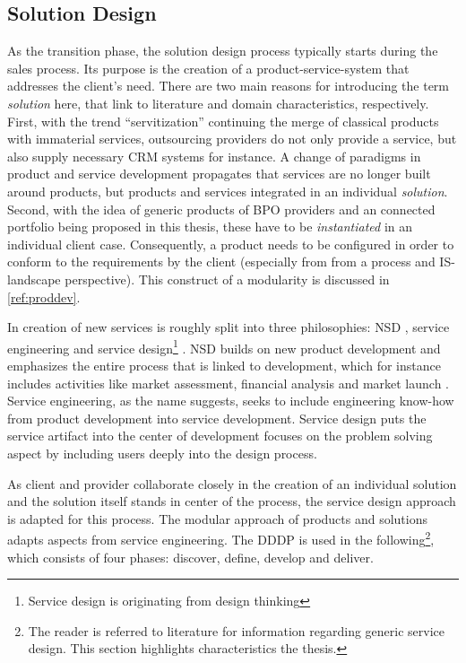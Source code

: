 \subsection{Solution Design}
	\label{sec:soldef}
	As the transition phase, the solution design process typically starts during the sales process. Its purpose is the creation of a product-service-system that addresses the client's need. There are two main reasons for introducing the term \textit{solution} here, that link to literature and domain characteristics, respectively. First, with the trend \enquote{servitization} \citep{servitization} continuing the merge of classical products with immaterial services, outsourcing providers do not only provide a service, but also supply necessary \acrshort{CRM} systems for instance. A change of paradigms in product and service development propagates that services are no longer built around products, but products and services integrated in an individual \textit{solution}\citep[]{Spath2006}.
	Second, with the idea of generic products of \acrshort{BPO} providers and an connected portfolio being proposed in this thesis, these have to be \textit{instantiated} in an individual client case. Consequently, a product needs to be configured in order to conform to the requirements by the client (especially from from a process and  \acrshort{IS}-landscape perspective). This construct of a modularity is discussed in \ref{ref:proddev}. 
	
	 In creation of new services is roughly split into three philosophies: \acrfull{NSD} \citep{cowell1988new}, service engineering \citep{9783540253242} and service design\footnote{Service design is originating from design thinking} \citep{rowe1987design}. \acrshort{NSD} builds on new product development and emphasizes the entire process that is linked to development, which for instance includes activities like market assessment, financial analysis and market launch \citep{cooper1988new}. Service engineering, as the name suggests, seeks to include engineering know-how from product development into service development. Service design puts the service artifact into the center of development focuses on the problem solving aspect by including users deeply into the design process. 
	 
	 As client and provider collaborate closely in the creation of an individual solution and the solution itself stands in center of the process, the service design approach is adapted for this process. The modular approach of products and solutions adapts aspects from service engineering. The \acrfull{DDDP} \citep{dcdd} is used in the following\footnote{The reader is referred to literature for information regarding generic service design. This section  highlights characteristics \wrt the thesis.}, which consists of four phases: discover, define, develop and deliver.
	 

